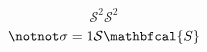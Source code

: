 \documentclass[10pt, twoside]{lecturenotes}
\begin{document}
\[
\mathord{\mbox{$\mathscr{S}$}}^2\mathscr{S}^2
\]
\[
\mathbf{\notnot\sigma} = 1 \mathcal{S} \mathbfcal{S}
\]
\end{document}
